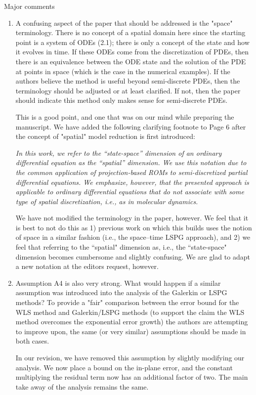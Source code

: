 \documentclass[3p,computermodern,10pt]{elsarticle}
\begin{document}
Major comments
\begin{enumerate}
\item A confusing aspect of the paper that should be addressed is the "space" terminology. There is no concept of a spatial domain here since the starting point is a system of ODEs (2.1); there is only a concept of the state and how it evolves in time. If these ODEs come from the discretization of PDEs, then there is an equivalence between the ODE state and the solution of the PDE at points in space (which is the case in the numerical examples). If the authors believe the method is useful beyond semi-discrete PDEs, then the terminology should be adjusted or at least clarified. If not, then the paper should indicate this method only makes sense for semi-discrete PDEs.

{\color{red} This is a good point, and one that was on our mind while preparing the manuscript. We have added the following clarifying footnote to Page 6 after the concept of "spatial" model reduction is first introduced:

\textit{In this work, we refer to the “state-space” dimension of an ordinary differential equation as the “spatial” dimension. We use this notation due to the common application of projection-based ROMs to semi-discretized partial differential equations. We emphasize, however, that the presented approach is applicable to ordinary differential equations that do not associate with some type of spatial discretization, i.e., as in molecular dynamics.}

We have not modified the terminology in the paper, however. We feel that it is best to not do this as 1) previous work on which this builds uses the notion of space in a similar fashion (i.e., the space--time LSPG approach), and 2) we feel that referring to the ``spatial" dimension as, i.e., the ``state-space" dimension becomes cumbersome and slightly confusing. We are glad to adapt a new notation at the editors request, however.} 


 \item  Assumption A4 is also very strong. What would happen if a similar assumption was introduced into the analysis of the Galerkin or LSPG methods? To provide a "fair" comparison between the error bound for the WLS method and Galerkin/LSPG methods (to support the claim the WLS method overcomes the exponential error growth) the authors are attempting to improve upon, the same (or very similar) assumptions should be made in both cases.

{\color{red} In our revision, we have removed this assumption by slightly modifying our analysis. We now place a bound on the in-plane error, and the constant multiplying the residual term now has an additional factor of two. The main take away of  the analysis remains the same.}
           

\end{enumerate}
\end{document}
